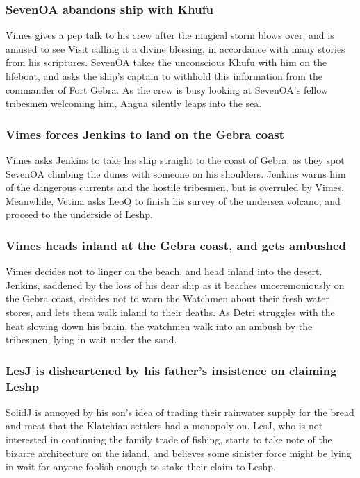 \subsubsection{\Gls{SevenOA} abandons ship with \Gls{Khufu}}
\Gls{Vimes} gives a pep talk to his crew after the magical storm blows over, and is amused to see
\Gls{Visit} calling it a divine blessing, in accordance with many stories from his scriptures.
\Gls{SevenOA} takes the unconscious \Gls{Khufu} with him on the lifeboat, and asks the ship's
captain to withhold this information from the commander of Fort Gebra. As the crew is busy looking
at \Gls{SevenOA}'s fellow tribesmen welcoming him, \Gls{Angua} silently leaps into the sea.

\subsubsection{\Gls{Vimes} forces \Gls{Jenkins} to land on the Gebra coast}
\Gls{Vimes} asks \Gls{Jenkins} to take his ship straight to the coast of Gebra, as they spot
\Gls{SevenOA} climbing the dunes with someone on his shoulders. \Gls{Jenkins} warns him of the
dangerous currents and the hostile tribesmen, but is overruled by \Gls{Vimes}. Meanwhile,
\Gls{Vetina} asks \Gls{LeoQ} to finish his survey of the undersea volcano, and proceed to the
underside of Leshp.

\subsubsection{\Gls{Vimes} heads inland at the Gebra coast, and gets ambushed}
\Gls{Vimes} decides not to linger on the beach, and head inland into the desert. \Gls{Jenkins},
saddened by the loss of his dear ship as it beaches unceremoniously on the Gebra coast, decides not
to warn the Watchmen about their fresh water stores, and lets them walk inland to their deaths.
As \Gls{Detri} struggles with the heat slowing down his brain, the watchmen walk into an ambush by
the tribesmen, lying in wait under the sand.

\subsubsection{\Gls{LesJ} is disheartened by his father's insistence on claiming Leshp}
\Gls{SolidJ} is annoyed by his son's idea of trading their rainwater supply for the bread and meat
that the Klatchian settlers had a monopoly on. \Gls{LesJ}, who is not interested in continuing the
family trade of fishing, starts to take note of the bizarre architecture on the island, and believes
some sinister force might be lying in wait for anyone foolish enough to stake their claim to Leshp.

